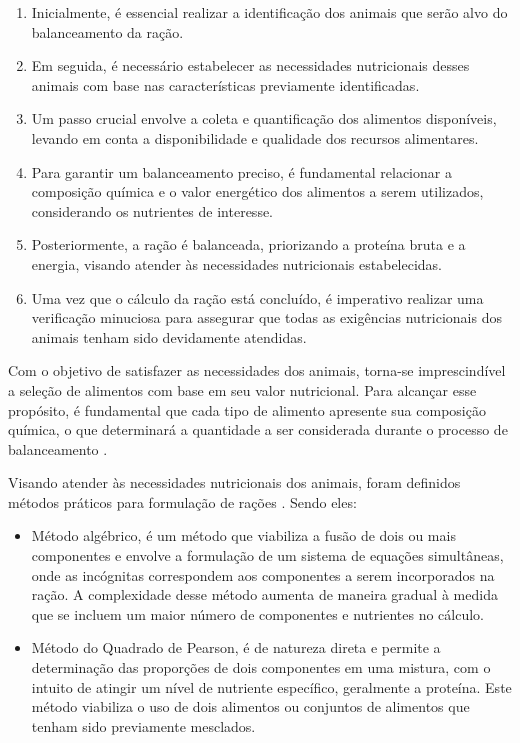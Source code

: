 \begin{enumerate}
  \item Inicialmente, é essencial realizar a identificação dos animais que serão alvo do balanceamento da ração.

  \item Em seguida, é necessário estabelecer as necessidades nutricionais desses animais com base nas características previamente identificadas.

  \item Um passo crucial envolve a coleta e quantificação dos alimentos disponíveis, levando em conta a disponibilidade e qualidade dos recursos alimentares.

  \item Para garantir um balanceamento preciso, é fundamental relacionar a composição química e o valor energético dos alimentos a serem utilizados, considerando os nutrientes de interesse.

  \item Posteriormente, a ração é balanceada, priorizando a proteína bruta e a energia, visando atender às necessidades nutricionais estabelecidas.

  \item Uma vez que o cálculo da ração está concluído, é imperativo realizar uma verificação minuciosa para assegurar que todas as exigências nutricionais dos animais tenham sido devidamente atendidas.
\end{enumerate}

Com o objetivo de satisfazer as necessidades dos animais, torna-se imprescindível a seleção de alimentos com base em seu valor nutricional. Para alcançar esse propósito, é fundamental que cada tipo de alimento apresente sua composição química, o que determinará a quantidade a ser considerada durante o processo de balanceamento \cite{Tomich:2015:NutricaoPrecisaoPecuariaLeiteira}.

Visando atender às necessidades nutricionais dos animais, foram definidos métodos práticos para formulação de rações \cite{Salman2020:ManualFormulacaoRacaoVacasLeiteiras}. Sendo eles:

\begin{itemize}
  \item Método algébrico, é um método que viabiliza a fusão de dois ou mais componentes e envolve a formulação de um sistema de equações simultâneas, onde as incógnitas correspondem aos componentes a serem incorporados na ração. A complexidade desse método aumenta de maneira gradual à medida que se incluem um maior número de componentes e nutrientes no cálculo.

  \item Método do Quadrado de Pearson, é de natureza direta e permite a determinação das proporções de dois componentes em uma mistura, com o intuito de atingir um nível de nutriente específico, geralmente a proteína. Este método viabiliza o uso de dois alimentos ou conjuntos de alimentos que tenham sido previamente mesclados.
\end{itemize}

